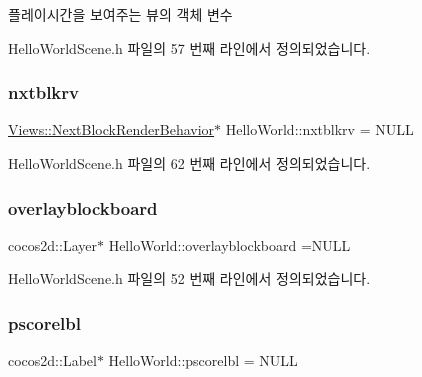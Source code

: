 플레이시간을 보여주는 뷰의 객체 변수 



Hello\+World\+Scene.\+h 파일의 57 번째 라인에서 정의되었습니다.

\mbox{\label{class_hello_world_ac06ca16fc5a18d32c58e0229c24817f6}} 
\subsubsection{\texorpdfstring{nxtblkrv}{nxtblkrv}}
{\footnotesize\ttfamily \hyperlink{class_tetris_1_1_views_1_1_next_block_render_behavior}{Views\+::\+Next\+Block\+Render\+Behavior}$\ast$ Hello\+World\+::nxtblkrv = N\+U\+LL\hspace{0.3cm}{\ttfamily [protected]}}



Hello\+World\+Scene.\+h 파일의 62 번째 라인에서 정의되었습니다.

\mbox{\label{class_hello_world_acc967707dff45c20f68321f07c86a21b}} 
\subsubsection{\texorpdfstring{overlayblockboard}{overlayblockboard}}
{\footnotesize\ttfamily cocos2d\+::\+Layer$\ast$ Hello\+World\+::overlayblockboard =N\+U\+LL\hspace{0.3cm}{\ttfamily [protected]}}



Hello\+World\+Scene.\+h 파일의 52 번째 라인에서 정의되었습니다.

\mbox{\label{class_hello_world_a7ed25294d2c42aec8b7b8f37bbf75a38}} 
\subsubsection{\texorpdfstring{pscorelbl}{pscorelbl}}
{\footnotesize\ttfamily cocos2d\+::\+Label$\ast$ Hello\+World\+::pscorelbl = N\+U\+LL\hspace{0.3cm}{\ttfamily [protected]}}



